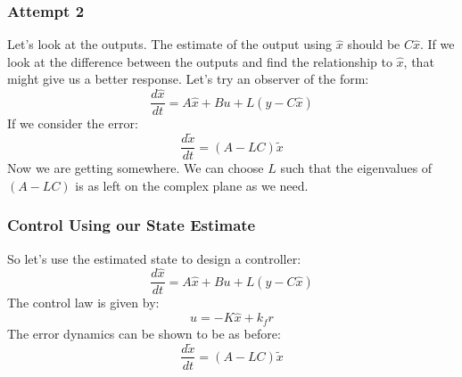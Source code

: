 \documentclass{beamer}
\theoremstyle{definition}
\theoremstyle{remark}
\begin{document}
\begin{frame}
\frametitle{Attempt 2}
Let's look at the outputs. The estimate of the output using $\hat{x}$ should be
$C \hat{x}$. If we look at the difference between the outputs and find the relationship to $\hat{x}$, 
that might give us a better response. 
Let's try an observer of the form: 
\begin{equation}
    \frac{d \hat{x}}{dt} = A \hat{x} + Bu + L(y - C \hat{x})
\end{equation}
If we consider the error: 
\begin{equation}
    \frac{d \tilde{x}}{dt} = (A - LC) \tilde{x}
\end{equation}
Now we are getting somewhere. 
We can choose $L$ such that the eigenvalues of $(A-LC)$ is as left on the complex plane 
as we need. 
\end{frame}

\begin{frame}
\frametitle{Control Using our State Estimate}
So let's use the estimated state to design a controller: 
\begin{equation}
    \frac{d \hat{x}}{dt} = A \hat{x} + B u + L(y - C \hat{x})
\end{equation}
The control law is given by: 
\begin{equation}
    u = - K \hat{x} + k_f r
\end{equation}
The error dynamics can be shown to be as before: 
\begin{equation}
    \frac{d \tilde{x}}{dt} = (A - LC)\tilde{x}
\end{equation}
\end{frame}
\end{document}
